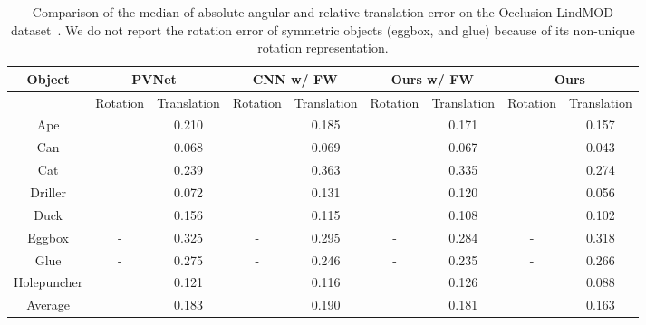 \documentclass[10pt,twocolumn,letterpaper]{article}
\begin{document}
\begin{table*}
\caption{Comparison of the median of absolute angular and relative translation error on the Occlusion LindMOD dataset~\cite{10.1007/978-3-319-10605-2_35}. We do not report the rotation error of symmetric objects (eggbox, and glue) because of its non-unique rotation representation.}
\centering
\vspace*{1mm}
\begin{tabular}{c||cc|cc|cc|cc}
  \hline
  {Object}
             & \multicolumn{2}{c|}{PVNet~\cite{peng2019pvnet}} &
               \multicolumn{2}{c|}{CNN w/ FW} &
               \multicolumn{2}{c|}{Ours w/ FW} &
               \multicolumn{2}{c}{Ours} \\ \hline
  & Rotation & Translation & Rotation & Translation & Rotation & Translation & Rotation & Translation\\ \hline
  Ape        &  & 0.210 &  & 0.185 &  & 0.171 &  & 0.157 \\
  Can        &  & 0.068 &  & 0.069 &  & 0.067 &  & 0.043 \\
  Cat        &  & 0.239 &  & 0.363 &  & 0.335 &  & 0.274 \\
  Driller    &  & 0.072 &  & 0.131 &  & 0.120 &  & 0.056 \\
  Duck       &  & 0.156 &  & 0.115 &  & 0.108 &  & 0.102 \\
  Eggbox     & -               & 0.325 & -               & 0.295 & -               & 0.284 & -               & 0.318 \\
  Glue       & -               & 0.275 & -               & 0.246 & -               & 0.235 & -               & 0.266 \\
  Holepuncher&  & 0.121 &  & 0.116 &  & 0.126 &  & 0.088 \\ \hline
  Average    &  & 0.183 &  & 0.190 &  & 0.181 &  & 0.163 \\ \hline
\end{tabular}
\label{tab:rot_trans_ablation_occ}
\end{table*}
\end{document}

